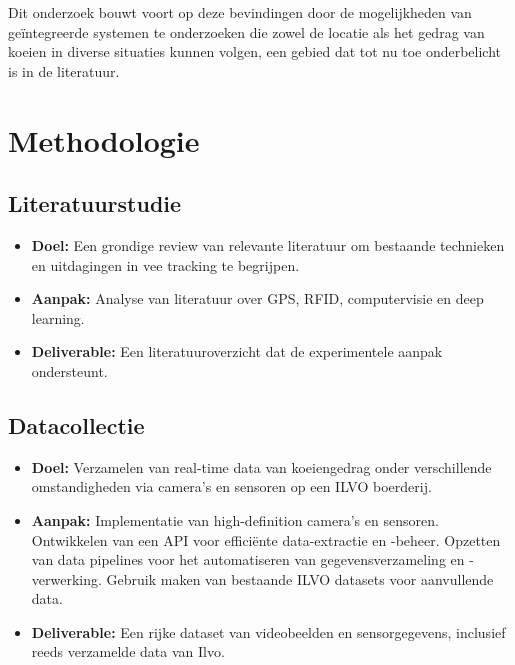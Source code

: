 Dit onderzoek bouwt voort op deze bevindingen door de mogelijkheden van geïntegreerde systemen te onderzoeken die zowel de locatie als het gedrag van koeien in diverse situaties kunnen volgen, een gebied dat tot nu toe onderbelicht is in de literatuur.

\section{Methodologie}%
\label{sec:methodologie}

\subsection{Literatuurstudie}
\begin{itemize}
  \item \textbf{Doel:} Een grondige review van relevante literatuur om bestaande technieken en uitdagingen in vee tracking te begrijpen.
  \item \textbf{Aanpak:} Analyse van literatuur over GPS, RFID, computervisie en deep learning.
  \item \textbf{Deliverable:} Een literatuuroverzicht dat de experimentele aanpak ondersteunt.
\end{itemize}
\subsection{Datacollectie}
\begin{itemize}
  \item \textbf{Doel:} Verzamelen van real-time data van koeiengedrag onder verschillende omstandigheden via camera's en sensoren op een ILVO boerderij.
  \item \textbf{Aanpak:} Implementatie van high-definition camera's en sensoren. Ontwikkelen van een API voor efficiënte data-extractie en -beheer. Opzetten van data pipelines voor het automatiseren van gegevensverzameling en -verwerking. Gebruik maken van bestaande ILVO datasets voor aanvullende data.
  \item \textbf{Deliverable:} Een rijke dataset van videobeelden en sensorgegevens, inclusief reeds verzamelde data van Ilvo.
\end{itemize}
